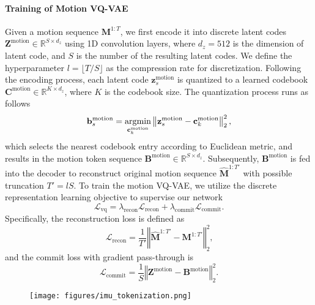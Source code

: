 \paragraph{Training of Motion VQ-VAE} Given a motion sequence $\mathbf{M}^{1:T}$, we first encode it into discrete latent codes $\mathbf{Z}^{\text{motion}} \in \mathbb{R}^{S\times d_z}$ using 1D convolution layers, where $d_z=512$ is the dimension of latent code, and $S$ is the number of the resulting latent codes. We define the hyperparameter $l=\lfloor T/S\rfloor$ as the compression rate for discretization. Following the encoding process, each latent code $\mathbf{z}_s^{\text{motion}}$ is quantized to a learned codebook $\mathbf{C}^{\text{motion}}\in \mathbb{R}^{K\times d_z}$, where $K$ is the codebook size. The quantization process runs as follows
\begin{equation}
    \mathbf{b}_{s}^{\text{motion}} = \underset{\mathbf{c}_k^{\text{motion}}}{\operatorname*{\arg\!\min}}\left\Vert \mathbf{z}_{s}^{\text{motion}}-\mathbf{c}_k^{\text{motion}} \right\Vert_2^2\text{,}
\end{equation}
which selects the nearest codebook entry according to Euclidean metric, and results in the motion token sequence $\mathbf B^{\text{motion}}\in \mathbb{R}^{S\times d_z}$. Subsequently, $\mathbf{B}^{\text{motion}}$ is fed into the decoder to reconstruct original motion sequence $\hat{\mathbf M}^{1:T'}$ with possible truncation $T'=lS$. To train the motion VQ-VAE, we utilize the discrete representation learning objective \cite{van2017neural} to supervise our network
\begin{equation}
    \mathcal{L}_{\text{vq}} = \lambda_{\text{recon}}\mathcal{L}_{\text{recon}} + \lambda_{\text{commit}}\mathcal{L}_{\text{commit}}\text{.}
\end{equation}
Specifically, the reconstruction loss is defined as
\begin{equation}
    \mathcal L_{\textrm{recon}} = \frac{1}{T'}\left\Vert \hat{\mathbf M}^{1:T'} - \mathbf M^{1:T'} \right\Vert_2^2\text{,}
    \label{eq:recon_loss}
\end{equation}
and the commit loss with gradient pass-through is
\begin{equation}
    \mathcal L_{\textrm{commit}} = \frac{1}{S} \left\Vert\mathbf{Z}^{\textrm{motion}} - \mathbf{B}^{\textrm{motion}}\right\Vert_2^2\text{.}
    \label{eq:commit_loss}
\end{equation}
\begin{figure}[t]
  \centering
  \texttt{[image: figures/imu\_tokenization.png]}
  \vspace{-15px}
\label{fig:imu_tokenizer}
\vspace{-10px}
\end{figure}
